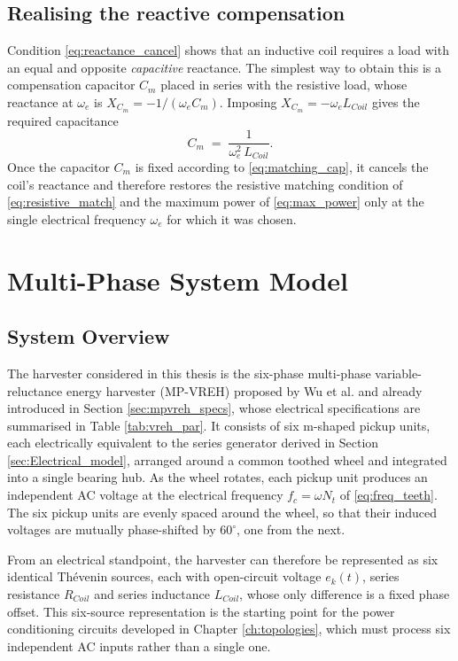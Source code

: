 \subsection{Realising the reactive compensation}

Condition \eqref{eq:reactance_cancel} shows that an inductive coil requires a load with an equal and opposite \emph{capacitive} reactance. The simplest way to obtain this is a compensation capacitor $C_m$ placed in series with the resistive load, whose reactance at $\omega_e$ is $X_{C_m} = -1/(\omega_e C_m)$. Imposing $X_{C_m} = -\omega_e L_{Coil}$ gives the required capacitance
\begin{equation}
    C_m \;=\; \frac{1}{\omega_e^2\,L_{Coil}}.
    \label{eq:matching_cap}
\end{equation}
Once the capacitor $C_m$ is fixed according to \eqref{eq:matching_cap}, it cancels the coil's reactance and therefore restores the resistive matching condition of \eqref{eq:resistive_match} and the maximum power of \eqref{eq:max_power} only at the single electrical frequency $\omega_e$ for which it was chosen.

\section{Multi-Phase System Model}
\label{sec:system_model}

\subsection{System Overview}

The harvester considered in this thesis is the six-phase multi-phase variable-reluctance energy harvester (MP-VREH) proposed by Wu et al. \cite{wuMultiPhaseVariableReluctance2024} and already introduced in Section \ref{sec:mpvreh_specs}, whose electrical specifications are summarised in Table \ref{tab:vreh_par}. It consists of six m-shaped pickup units, each electrically equivalent to the series generator derived in Section \ref{sec:Electrical_model}, arranged around a common toothed wheel and integrated into a single bearing hub. As the wheel rotates, each pickup unit produces an independent AC voltage at the electrical frequency $f_c=\omega N_t$ of \eqref{eq:freq_teeth}. The six pickup units are evenly spaced around the wheel, so that their induced voltages are mutually phase-shifted by $60^\circ$, one from the next.

From an electrical standpoint, the harvester can therefore be represented as six identical Th\'{e}venin sources, each with open-circuit voltage $e_k(t)$, series resistance $R_{Coil}$ and series inductance $L_{Coil}$, whose only difference is a fixed phase offset. This six-source representation is the starting point for the power conditioning circuits developed in Chapter \ref{ch:topologies}, which must process six independent AC inputs rather than a single one.

